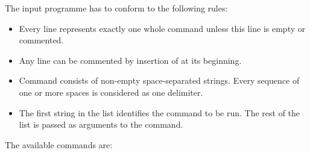 
The input programme has to conform to the following rules:

\begin{itemize}
  \item Every line represents exactly one whole command unless this line is empty or commented.
  \item Any line can be commented by insertion of \ttt{\#} at its beginning.
  \item Command consists of non-empty space-separated strings. Every sequence of one or more spaces is considered as one delimiter.
  \item The first string in the list identifies the command to be run. The rest of the list is passed as arguments to the command.
\end{itemize}

The available commands are:

